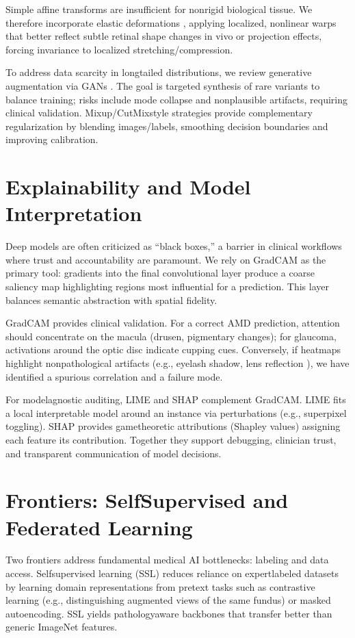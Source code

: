 Simple affine transforms are insufficient for non\textendash rigid biological tissue. We therefore incorporate elastic deformations \cite{docxRef46,docxRef47,docxRef48,docxRef49,docxRef50}, applying localized, non\textendash linear warps that better reflect subtle retinal shape changes in vivo or projection effects, forcing invariance to localized stretching/compression.

To address data scarcity in long\textendash tailed distributions, we review generative augmentation via GANs \cite{docxRef52,docxRef53,docxRef54,docxRef55,docxRef56}. The goal is targeted synthesis of rare variants to balance training; risks include mode collapse and non\textendash plausible artifacts, requiring clinical validation. Mixup/CutMix\textendash style strategies \cite{docxRef62} provide complementary regularization by blending images/labels, smoothing decision boundaries and improving calibration.

\section{Explainability and Model Interpretation}
Deep models are often criticized as ``black boxes,'' a barrier in clinical workflows where trust and accountability are paramount. We rely on Grad\textendash CAM as the primary tool: gradients into the final convolutional layer produce a coarse saliency map highlighting regions most influential for a prediction. This layer balances semantic abstraction with spatial fidelity.

Grad\textendash CAM provides clinical validation. For a correct AMD prediction, attention should concentrate on the macula (drusen, pigmentary changes); for glaucoma, activations around the optic disc indicate cupping cues. Conversely, if heatmaps highlight non\textendash pathological artifacts (e.g., eyelash shadow, lens reflection \cite{docxRef04,docxRef05}), we have identified a spurious correlation and a failure mode.

For model\textendash agnostic auditing, LIME and SHAP \cite{docxRef42,docxRef43,docxRef44,docxRef45} complement Grad\textendash CAM. LIME fits a local interpretable model around an instance via perturbations (e.g., superpixel toggling). SHAP provides game\textendash theoretic attributions (Shapley values) assigning each feature its contribution. Together they support debugging, clinician trust, and transparent communication of model decisions.

\section{Frontiers: Self\textendash Supervised and Federated Learning}
Two frontiers address fundamental medical AI bottlenecks: labeling and data access. Self\textendash supervised learning (SSL) \cite{docxRef66} reduces reliance on expert\textendash labeled datasets by learning domain representations from pretext tasks such as contrastive learning (e.g., distinguishing augmented views of the same fundus) or masked autoencoding. SSL yields pathology\textendash aware backbones that transfer better than generic ImageNet features.

